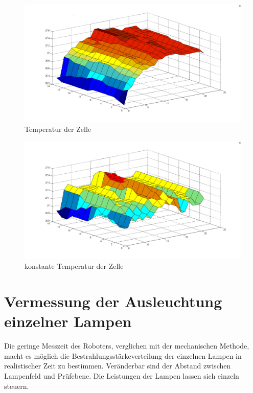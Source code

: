 \documentclass[a4paper,bibtotoc,oneside]{scrbook}
\begin{document}
\begin{figure}[htbp]
\centering
\includegraphics[width=150mm]{img/tempm1.png}
\caption[Temperatur der Zelle]{Temperatur der Zelle}\label{tm1}
\end{figure}

\begin{figure}[htbp]
\centering
\includegraphics[width=150mm]{img/tempm2.png}
\caption[konstante Temperatur der Zelle]{konstante Temperatur der Zelle}\label{tm2}
\end{figure}


\section{Vermessung der Ausleuchtung einzelner Lampen}

Die geringe Messzeit des Roboters, verglichen mit der mechanischen Methode, macht es möglich die Bestrahlungsstärkeverteilung der einzelnen Lampen in realistischer Zeit zu bestimmen.
Veränderbar sind der Abstand zwischen Lampenfeld und Prüfebene. Die Leistungen der Lampen lassen sich einzeln steuern. 
\end{document}
